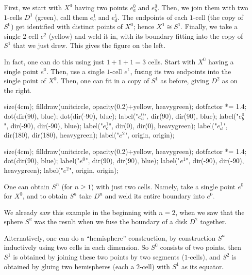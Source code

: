 \begin{example}
	\listhack
	\begin{enumerate}[(a)]
	\ii First, we start with $X^0$ having two points $e_a^0$ and $e_b^0$.
	Then, we join them with two $1$-cells $D^1$ (green),
	call them $e_c^1$ and $e_d^1$.
	The endpoints of each $1$-cell (the copy of $S^0$) get identified
	with distinct points of $X^0$; hence $X^1 \cong S^1$.
	Finally, we take a single $2$-cell $e^2$ (yellow) and weld it in,
	with its boundary fitting into the copy of $S^1$ that we just drew.
	This gives the figure on the left.

	\ii In fact, one can do this using just $1+1+1=3$ cells.
	Start with $X^0$ having a single point $e^0$.
	Then, use a single $1$-cell $e^1$, fusing its two endpoints
	into the single point of $X^0$.
	Then, one can fit in a copy of $S^1$ as before,
	giving $D^2$ as on the right.
	\end{enumerate}
	\begin{center}
		\begin{asy}
			size(4cm);
			filldraw(unitcircle, opacity(0.2)+yellow, heavygreen);
			dotfactor *= 1.4;
			dot(dir(90), blue);
			dot(dir(-90), blue);
			label("$e_a^0$", dir(90), dir(90), blue);
			label("$e_b^0$", dir(-90), dir(-90), blue);
			label("$e_c^1$", dir(0), dir(0), heavygreen);
			label("$e_d^1$", dir(180), dir(180), heavygreen);
			label("$e^2$", origin, origin);
		\end{asy}
		\qquad
		\begin{asy}
			size(4cm);
			filldraw(unitcircle, opacity(0.2)+yellow, heavygreen);
			dotfactor *= 1.4;
			dot(dir(90), blue);
			label("$e^0$", dir(90), dir(90), blue);
			label("$e^1$", dir(-90), dir(-90), heavygreen);
			label("$e^2$", origin, origin);
		\end{asy}
	\end{center}
\end{example}

\begin{example}
	[$S^n$ as a cW complex]
	\listhack
	\begin{enumerate}[(a)]
		\ii One can obtain $S^n$ (for $n \ge 1$) with just two cells.
		Namely, take a single point $e^0$ for $X^0$, and to obtain $S^n$
		take $D^n$ and weld its entire boundary into $e^0$.

		We already saw this example in the beginning with $n=2$,
		when we saw that the sphere $S^2$ was the result when we fuse
		the boundary of a disk $D^2$ together.
		
		\ii Alternatively, one can do a ``hemisphere'' construction,
		by construction $S^n$ inductively using two cells in each dimension.
		So $S^0$ consists of two points, then $S^1$ is obtained
		by joining these two points by two segments ($1$-cells),
		and $S^2$ is obtained by gluing two hemispheres (each a $2$-cell)
		with $S^1$ as its equator.
	\end{enumerate}
\end{example}

